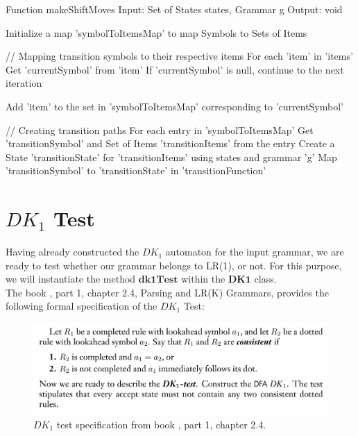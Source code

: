 \begin{codeblock}
    Function makeShiftMoves
    Input: Set of States states, Grammar g
    Output: void

    Initialize a map 'symbolToItemsMap' to map Symbols to Sets of Items

    // Mapping transition symbols to their respective items
    For each 'item' in 'items'
    Get 'currentSymbol' from 'item'
    If 'currentSymbol' is null, continue to the next iteration

    Add 'item' to the set in 'symbolToItemsMap' corresponding to 'currentSymbol'

    // Creating transition paths
    For each entry in 'symbolToItemsMap'
    Get 'transitionSymbol' and Set of Items 'transitionItems' from the entry
    Create a State 'transitionState' for 'transitionItems' using states and grammar 'g'
    Map 'transitionSymbol' to 'transitionState' in 'transitionFunction'
\end{codeblock}

\newpage


\section{\(DK_{1}\) Test}\label{sec:DK1 Test}

Having already constructed the \(DK_{1}\) automaton for the input grammar, we are ready to test whether our grammar belongs to LR(1), or not. For this purpose, we will instantiate the method \(\boldsymbol{dk1Test}\) within the \(\boldsymbol{DK1}\) class.\\

The book \cite{sipser}, part 1, chapter 2.4, Parsing and LR(K) Grammars, provides the following formal specification of the \(DK_{1}\) Test:


\begin{figure}[h!]
    \includegraphics[width=\linewidth]{DK1 test conditions.png}
    \caption{\(DK_{1}\) test specification from book \cite{sipser}, part 1, chapter 2.4.}
    \label{figure 4}
\end{figure}



